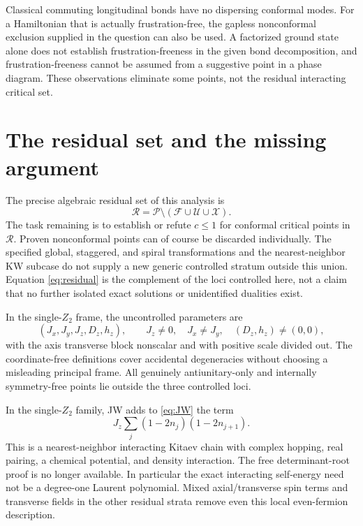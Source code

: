 \documentclass[11pt]{article}
\newcommand{\F}{\mathcal F}
\newcommand{\U}{\mathcal U}
\newcommand{\X}{\mathcal X}
\newcommand{\cP}{\mathcal P}
\newcommand{\cR}{\mathcal R}
\begin{document}
Classical commuting longitudinal bonds have no dispersing conformal modes.
For a Hamiltonian that is actually frustration-free, the gapless
nonconformal exclusion supplied in the question can also be used. A
factorized ground state alone does not establish frustration-freeness in the
given bond decomposition, and frustration-freeness cannot be assumed from
a suggestive point in a phase diagram. These observations eliminate some
points, not the residual interacting critical set.

\section{The residual set and the missing argument}

The precise algebraic residual set of this analysis is
\begin{equation}
 \boxed{\cR=\cP\setminus(\F\cup\U\cup\X).} \label{eq:residual}
\end{equation}
The task remaining is to establish or refute $c\le1$ for conformal critical
points in $\cR$. Proven nonconformal points can of course be discarded
individually. The specified global, staggered, and spiral transformations
and the nearest-neighbor KW subcase do not supply a new generic controlled
stratum outside this union. Equation \eqref{eq:residual} is the complement
of the loci controlled here, not a claim that no further isolated exact
solutions or unidentified dualities exist.

In the single-$Z_2$ frame, the uncontrolled parameters are
\begin{equation}
 (J_x,J_y,J_z,D_z,h_z),\qquad
 J_z\ne0,\quad J_x\ne J_y,\quad (D_z,h_z)\ne(0,0),
\end{equation}
with the axis transverse block nonscalar and with positive scale divided
out. The coordinate-free definitions cover accidental degeneracies without
choosing a misleading principal frame. All genuinely antiunitary-only and
internally symmetry-free points lie outside the three controlled loci.

In the single-$Z_2$ family, JW adds to \eqref{eq:JW} the term
\begin{equation}
 J_z\sum_j(1-2n_j)(1-2n_{j+1}).
\end{equation}
This is a nearest-neighbor interacting Kitaev chain with complex hopping,
real pairing, a chemical potential, and density interaction. The free
determinant-root proof is no longer available. In particular the exact
interacting self-energy need not be a degree-one Laurent polynomial.
Mixed axial/transverse spin terms and transverse fields in the other
residual strata remove even this local even-fermion description.
\end{document}
